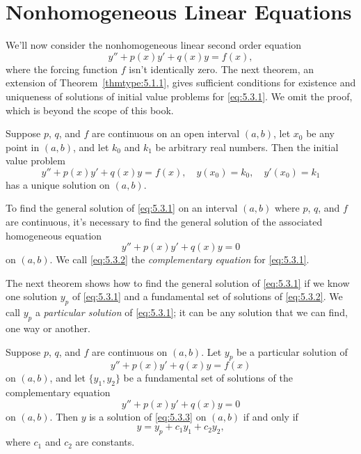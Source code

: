 \section{Nonhomogeneous Linear Equations}

\noindent
We'll now consider the nonhomogeneous linear second order equation
\begin{equation}
  \label{eq:5.3.1}y''+p(x)y'+q(x)y=f(x),
\end{equation}
where the forcing function $f$ isn't identically zero. The next theorem, an extension of
Theorem~\ref{thmtype:5.1.1}, gives sufficient conditions for existence and uniqueness of solutions
of initial value problems for \eqref{eq:5.3.1}. We omit the proof, which is beyond the scope of this
book.

\begin{theorem}
  \color{blue}
  \label{thmtype:5.3.1} Suppose $p$, $q$, and $f$ are continuous on an open interval $(a,b)$, let
  $x_{0}$ be any point in $(a,b)$, and let $k_{0}$ and $k_{1}$ be arbitrary real numbers. Then the
  initial value problem
  \[
    y''+p(x)y'+q(x)y=f(x),\quad y(x_{0})=k_{0},\quad y'(x_{0})=k_{1}
  \]
  has a unique solution on $(a,b)$.
\end{theorem}

To find the general solution of \eqref{eq:5.3.1} on an interval $(a,b)$ where $p$, $q$, and $f$ are
continuous, it's necessary to find the general solution of the associated homogeneous equation
\begin{equation}
  \label{eq:5.3.2}y''+p(x)y'+q(x)y=0
\end{equation}
on $(a,b)$. We call \eqref{eq:5.3.2} the {\color{blue}\it complementary equation\/} for
\eqref{eq:5.3.1}.

The next theorem shows how to find the general solution of \eqref{eq:5.3.1} if we know one solution
$y_{p}$ of \eqref{eq:5.3.1} and a fundamental set of solutions of \eqref{eq:5.3.2}. We call $y_{p}$
a {\color{blue}\it particular solution\/} of \eqref{eq:5.3.1}; it can be any solution that we can
find, one way or another.

\begin{theorem}
  \color{blue}
  \label{thmtype:5.3.2} Suppose $p$, $q$, and $f$ are continuous on $(a,b)$. Let $y_{p}$ be a
  particular solution of
  \begin{equation}
    \label{eq:5.3.3}y''+p(x)y'+q(x)y=f(x)
  \end{equation}
  on $(a,b)$, and let $\{y_{1},y_{2}\}$ be a fundamental set of solutions of the complementary
  equation
  \begin{equation}
    \label{eq:5.3.4}y''+p(x)y'+q(x)y=0
  \end{equation}
  on $(a,b)$. Then $y$ is a solution of \eqref{eq:5.3.3} on $(a,b)$ if and only if
  \begin{equation}
    \label{eq:5.3.5}y=y_{p}+c_{1}y_{1}+c_{2}y_{2},
  \end{equation}
  where $c_{1}$ and $c_{2}$ are constants.
\end{theorem}

